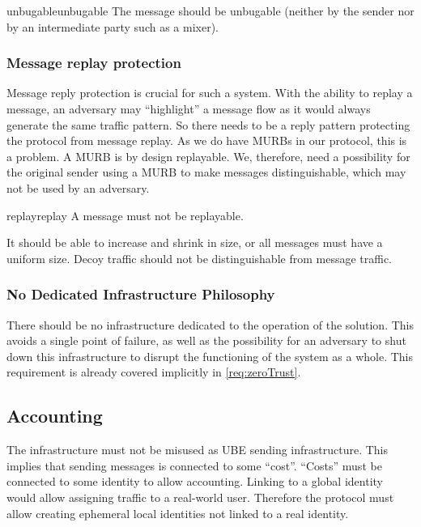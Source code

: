 \begin{requirement}{unbugable}{unbugable}
	The message should be unbugable (neither by the sender nor by an intermediate party such as a mixer).
\end{requirement}

\subsubsection{Message replay protection}
Message reply protection is crucial for such a system. With the ability to replay a message, an adversary may ``highlight'' a message flow as it would always generate the same traffic pattern. So there needs to be a reply pattern protecting the protocol from message replay. As we do have MURBs in our protocol, this is a problem. A MURB is by design replayable. We, therefore, need a possibility for the original sender using a MURB to make messages distinguishable, which may not be used by an adversary.

\begin{requirement}{replay}{replay}
	A message must not be replayable.
\end{requirement}

It should be able to increase and shrink in size, or all messages must have a uniform size. Decoy traffic should not be distinguishable from message traffic. 

\subsubsection{No Dedicated Infrastructure Philosophy}
There should be no infrastructure dedicated to the operation of the solution. This avoids a single point of failure, as well as the possibility for an adversary to shut down this infrastructure to disrupt the functioning of the system as a whole. This requirement is already covered implicitly in \ref{req:zeroTrust}.

\subsection{Accounting}
The infrastructure must not be misused as UBE sending infrastructure. This implies that sending messages is connected to some ``cost''. ``Costs'' must be connected to some identity to allow accounting. Linking to a global identity would allow assigning traffic to a real-world user. Therefore the protocol must allow creating ephemeral local identities not linked to a real identity.

